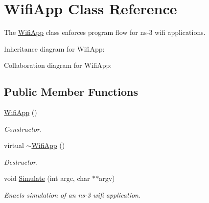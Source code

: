 \hypertarget{classWifiApp}{}\section{Wifi\+App Class Reference}
\label{classWifiApp}


The \hyperlink{classWifiApp}{Wifi\+App} class enforces program flow for ns-\/3 wifi applications.  




Inheritance diagram for Wifi\+App\+:


Collaboration diagram for Wifi\+App\+:
\subsection*{Public Member Functions}
\begin{DoxyCompactItemize}
\item 
\hyperlink{classWifiApp_a991431db976e461bea0370ddcb76d67f}{Wifi\+App} ()
\begin{DoxyCompactList}\small\item\em Constructor. \end{DoxyCompactList}\item 
virtual \hyperlink{classWifiApp_adf6ecdbc1fccd4ccdd9f7c50b228ebb2}{$\sim$\+Wifi\+App} ()
\begin{DoxyCompactList}\small\item\em Destructor. \end{DoxyCompactList}\item 
void \hyperlink{classWifiApp_a3a95c7b7e96a5c40810d6fee12b9540c}{Simulate} (int argc, char $\ast$$\ast$argv)
\begin{DoxyCompactList}\small\item\em Enacts simulation of an ns-\/3 wifi application. \end{DoxyCompactList}\end{DoxyCompactItemize}
